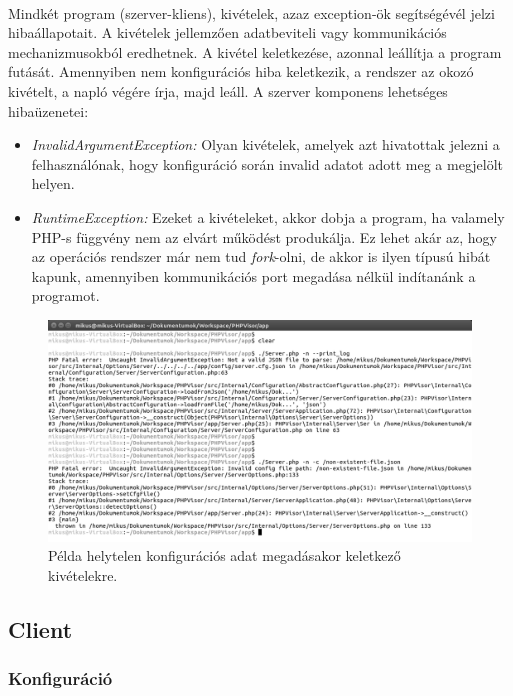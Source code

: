 \documentclass[12pt]{report}
\begin{document}
  \paragraph{}
 Mindkét program (szerver-kliens), kivételek, azaz exception-ök segítségévél jelzi hibaállapotait. A kivételek jellemzően adatbeviteli vagy kommunikációs mechanizmusokból eredhetnek.  A kivétel keletkezése, azonnal leállítja a program futását. Amennyiben nem konfigurációs hiba keletkezik, a rendszer az okozó kivételt, a napló végére írja, majd leáll.	
 A szerver komponens lehetséges hibaüzenetei:
 \begin{itemize}
 \item \textit{InvalidArgumentException:} Olyan kivételek, amelyek azt hivatottak jelezni a felhasználónak, hogy  konfiguráció során invalid adatot adott meg a megjelölt helyen. 
 \item \textit{RuntimeException:} Ezeket a kivételeket, akkor dobja a program, ha valamely PHP-s függvény nem az elvárt működést produkálja. Ez lehet akár az, hogy az operációs rendszer már nem tud \textit{fork}-olni, de akkor is ilyen típusú hibát kapunk, amennyiben kommunikációs port megadása nélkül indítanánk a programot.
 \end{itemize}
  \begin{figure}[ht]
  \centering
  \includegraphics[width=14cm]{pics/runerr.png}
	  \caption{Példa helytelen konfigurációs adat megadásakor keletkező kivételekre. \newline}
      \label{fig:runerr}
  \end{figure}
  
  \pagebreak
\subsection{Client}
\subsubsection{Konfiguráció}
\end{document}
